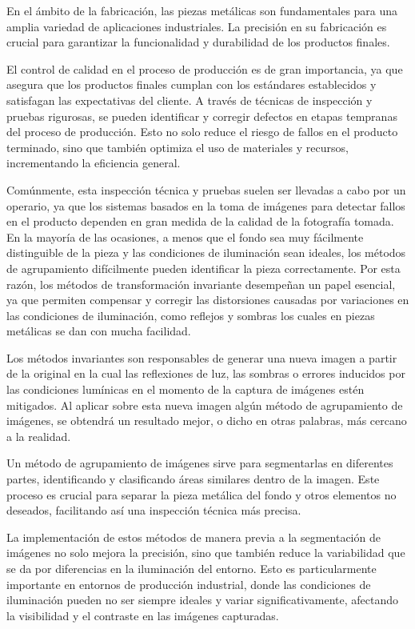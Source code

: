 
En el ámbito de la fabricación, las piezas metálicas son fundamentales para una amplia variedad de aplicaciones industriales. La precisión en su fabricación es crucial para garantizar la funcionalidad y durabilidad de los productos finales. 

El control de calidad en el proceso de producción es de gran importancia, ya que asegura que los productos finales cumplan con los estándares establecidos y satisfagan las expectativas del cliente. A través de técnicas de inspección y pruebas rigurosas, se pueden identificar y corregir defectos en etapas tempranas del proceso de producción. Esto no solo reduce el riesgo de fallos en el producto terminado, sino que también optimiza el uso de materiales y recursos, incrementando la eficiencia general.\cite{jmmp6060141}

Comúnmente, esta inspección técnica y pruebas suelen ser llevadas a cabo por un operario, ya que los sistemas basados en la toma de imágenes para detectar fallos en el producto dependen en gran medida de la calidad de la fotografía tomada. En la mayoría de las ocasiones, a menos que el fondo sea muy fácilmente distinguible de la pieza y las condiciones de iluminación sean ideales, los métodos de agrupamiento difícilmente pueden identificar la pieza correctamente. Por esta razón, los métodos de transformación invariante desempeñan un papel esencial, ya que permiten compensar y corregir las distorsiones causadas por variaciones en las condiciones de iluminación, como reflejos y sombras los cuales en piezas metálicas se dan con mucha facilidad. \cite{vafadar2021}\cite{jmmp6060141}

Los métodos invariantes son responsables de generar una nueva imagen a partir de la original en la cual las reflexiones de luz, las sombras o errores inducidos por las condiciones lumínicas en el momento de la captura de imágenes estén mitigados. Al aplicar sobre esta nueva imagen algún método de agrupamiento de imágenes, se obtendrá un resultado mejor, o dicho en otras palabras, más cercano a la realidad.

Un método de agrupamiento de imágenes sirve para segmentarlas en diferentes partes, identificando y clasificando áreas similares dentro de la imagen. Este proceso es crucial para separar la pieza metálica del fondo y otros elementos no deseados, facilitando así una inspección técnica más precisa.\cite{bento2019non}

La implementación de estos métodos de manera previa a la segmentación de imágenes no solo mejora la precisión, sino que también reduce la variabilidad que se da por diferencias en la iluminación del entorno. Esto es particularmente importante en entornos de producción industrial, donde las condiciones de iluminación pueden no ser siempre ideales y variar significativamente, afectando la visibilidad y el contraste en las imágenes capturadas.\cite{karunakaran2012rapid}

